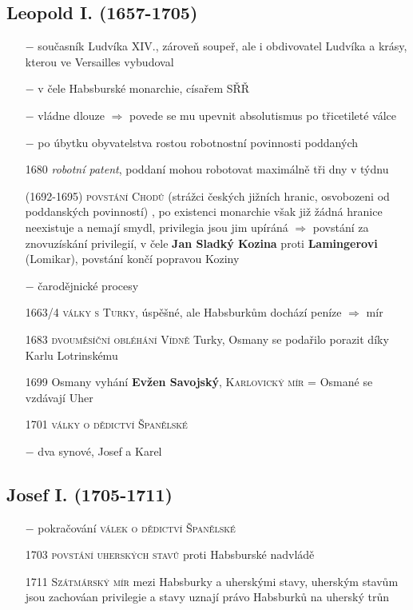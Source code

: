 \documentclass{article}
\begin{document}
\subsection*{Leopold I. (1657-1705)}
\begin{itemize}
    \vspace{-0.5em}
    \setlength\itemsep{0.15em}
    \item[$-$] současník Ludvíka XIV., zároveň soupeř, ale i obdivovatel Ludvíka a krásy, kterou ve Versailles vybudoval
    \item[$-$] v čele Habsburské monarchie, císařem SŘŘ
    \item[$-$] vládne dlouze $\Rightarrow$ povede se mu upevnit absolutismus po třicetileté válce
    \item[$-$] po úbytku obyvatelstva rostou robotnostní povinnosti poddaných
    \item[1680] \textit{robotní patent}, poddaní mohou robotovat maximálně tři dny v týdnu
    \item[(1692-1695)] \textsc{povstání Chodů} (strážci českých jižních hranic, osvobozeni od poddanských povinností) , po existenci monarchie však již žádná hranice neexistuje a nemají smydl, privilegia jsou jim upíráná $\Rightarrow$ povstání za znovuzískání privilegií, v čele \textbf{Jan Sladký Kozina} proti \textbf{Lamingerovi} (Lomikar), povstání končí popravou Koziny
    \item[$-$] čarodějnické procesy
    \item[1663/4] \textsc{války s Turky}, úspěšné, ale Habsburkům dochází peníze $\Rightarrow$ mír
    \item[1683]  \textsc{dvouměsíční obléhání Vídně} Turky, Osmany se podařilo porazit díky Karlu Lotrinskému
    \item[1699] Osmany vyhání \textbf{Evžen Savojský}, \textsc{Karlovický mír} = Osmané se vzdávají Uher
    \item[1701] \textsc{války o dědictví Španělské}
    \item[$-$] dva synové, Josef a Karel

\end{itemize}


\subsection*{Josef I. (1705-1711)}
\begin{itemize}
    \vspace{-0.5em}
    \setlength\itemsep{0.15em}
    \item[$-$] pokračování \textsc{válek o dědictví Španělské}
    \item[1703] \textsc{povstání uherských stavů} proti Habsburské nadvládě
    \item[1711] \textsc{Szátmárský mír} mezi Habsburky a uherskými stavy, uherským stavům jsou zachováan privilegie a stavy uznají právo Habsburků na uherský trůn
\end{itemize}
\end{document}
